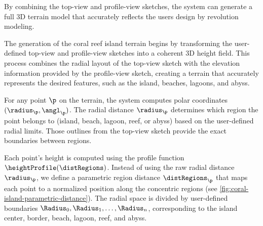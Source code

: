 By combining the top-view and profile-view sketches, the system can generate a full 3D terrain model that accurately reflects the users design by revolution modeling.

The generation of the coral reef island terrain begins by transforming the user-defined top-view and profile-view sketches into a coherent 3D height field. This process combines the radial layout of the top-view sketch with the elevation information provided by the profile-view sketch, creating a terrain that accurately represents the desired features, such as the island, beaches, lagoons, and abyss.

For any point $\p$ on the terrain, the system computes polar coordinates $(\radius_\p, \angl_\p)$. The radial distance $\radius_\p$ determines which region the point belongs to (island, beach, lagoon, reef, or abyss) based on the user-defined radial limits. Those outlines from the top-view sketch provide the exact boundaries between regions.

Each point's height is computed using the profile function $\heightProfile(\distRegions)$. Instead of using the raw radial distance $\radius_\p$, we define a parametric region distance $\distRegions_\p$ that maps each point to a normalized position along the concentric regions (see \cref{fig:coral-island-parametric-distance}). The radial space is divided by user-defined boundaries $\Radius_0, \Radius_1, \dots, \Radius_n$, corresponding to the island center, border, beach, lagoon, reef, and abyss.




